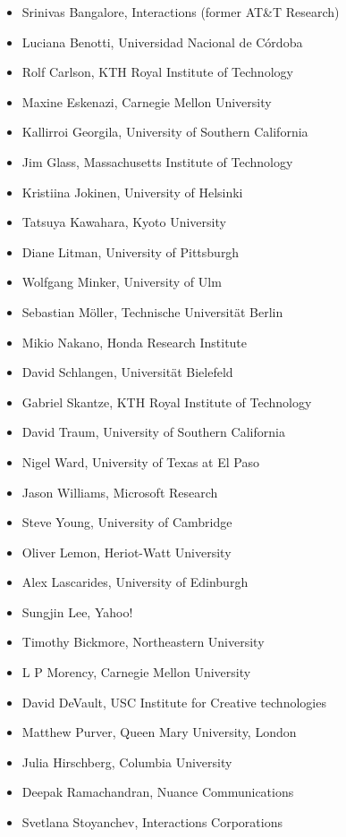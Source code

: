 \documentclass[12pt]{article}
\begin{document}
\begin{itemize}
\item Srinivas Bangalore, Interactions (former AT\&T Research)
\item Luciana Benotti, Universidad Nacional de Córdoba
\item Rolf Carlson, KTH Royal Institute of Technology
\item Maxine Eskenazi, Carnegie Mellon University
\item Kallirroi Georgila, University of Southern California
\item Jim Glass, Massachusetts Institute of Technology
\item Kristiina Jokinen, University of Helsinki
\item Tatsuya Kawahara, Kyoto University
\item Diane Litman, University of Pittsburgh
\item Wolfgang Minker, University of Ulm
\item Sebastian Möller, Technische Universität Berlin
\item Mikio Nakano, Honda Research Institute
\item David Schlangen, Universität Bielefeld
\item Gabriel Skantze, KTH Royal Institute of Technology
\item David Traum, University of Southern California
\item Nigel Ward, University of Texas at El Paso
\item Jason Williams, Microsoft Research
\item Steve Young, University of Cambridge
\item Oliver Lemon, Heriot-Watt University
\item Alex Lascarides, University of Edinburgh
\item Sungjin Lee, Yahoo!
\item Timothy Bickmore, Northeastern University
\item L P Morency, Carnegie Mellon University
\item David DeVault, USC Institute for Creative technologies
\item Matthew Purver, Queen Mary University, London
\item Julia Hirschberg, Columbia University
\item Deepak Ramachandran, Nuance Communications
\item Svetlana Stoyanchev, Interactions Corporations 
\end{itemize}
\pagebreak
\end{document}
